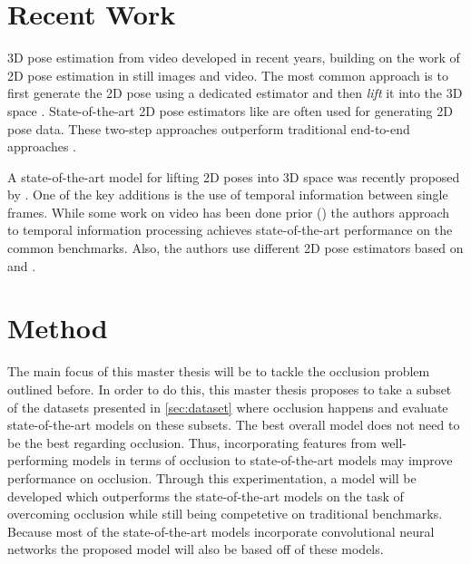 \documentclass[twoside]{article}
\begin{document}
\begin{multicols}{2}
\section{Recent Work}
\label{sec:recent}
3D pose estimation from video developed in recent years, building on the work of 2D pose estimation in still images and video.
The most common approach is to first generate the 2D pose using a dedicated estimator and then \textit{lift} it into the 3D space \cite{pavllo_3d_2018}\cite{martinez_simple_2017}.
State-of-the-art 2D pose estimators like \cite{newell_stacked_2016}\cite{wei_convolutional_2016} are often used for generating 2D pose data.
These two-step approaches outperform traditional end-to-end approaches \cite{pavllo_3d_2018}.

A state-of-the-art model for lifting 2D poses into 3D space was recently proposed by \cite{pavllo_3d_2018}.
One of the key additions is the use of temporal information between single frames.
While some work on video has been done prior (\cite{lin_recurrent_nodate}\cite{hossain_exploiting_2018}) the authors approach to temporal information processing achieves state-of-the-art performance on the common benchmarks. 
Also, the authors use different 2D pose estimators based on \cite{he_mask_2017} and \cite{chen_cascaded_2018}.


\section{Method}

The main focus of this master thesis will be to tackle the occlusion problem outlined before.
In order to do this, this master thesis proposes to take a subset of the datasets presented in \ref{sec:dataset} where occlusion happens and evaluate state-of-the-art models on these subsets.
The best overall model does not need to be the best regarding occlusion.
Thus, incorporating features from well-performing models in terms of occlusion to state-of-the-art models may improve performance on occlusion.
Through this experimentation, a model will be developed which outperforms the state-of-the-art models on the task of overcoming occlusion while still being competetive on traditional benchmarks.
Because most of the state-of-the-art models incorporate convolutional neural networks the proposed model will also be based off of these models.


\end{multicols}
\end{document}
